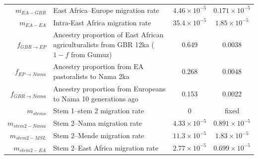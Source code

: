\documentclass[]{article}
\begin{document}
\begin{table}[ht]
\begin{tabular}[t]{rP{8cm}cc}
    $m_{EA-GBR}$ & East Africa--Europe migration rate & $4.46\times10^{-5}$ & $0.171\times10^{-5}$ \\
    $m_{EA-EA}$ & Intra-East Africa migration rate & $35.4\times10^{-5}$ & $1.85\times10^{-5}$ \\
    $f_{GBR \rightarrow EP}$ & Ancestry proportion of East African agriculturalists from GBR 12ka ($1-f$ from Gumuz) & 0.649 & 0.0038 \\
    $f_{EP \rightarrow Nama}$ & Ancestry proportion from EA pastoralists to Nama 2ka & 0.268 & 0.0048 \\
    $f_{GBR \rightarrow Nama}$ & Ancestry proportion from Europeans to Nama 10 generations ago & 0.153 & 0.0022 \\
    $m_{stems}$ & Stem 1--stem 2 migration rate & $0$ & fixed \\
    $m_{stem2-Nama}$ & Stem 2--Nama migration rate & $4.33\times10^{-5}$ & $0.891\times10^{-5}$ \\
    $m_{stem2-MSL}$ & Stem 2--Mende migration rate & $11.3\times10^{-5}$ & $1.83\times10^{-5}$ \\
    $m_{stem2-EA}$ & Stem 2--East Africa migration rate & $2.77\times10^{-5}$ & $0.699\times10^{-5}$ \\
    \bottomrule
\end{tabular}
\end{table}
\end{document}
